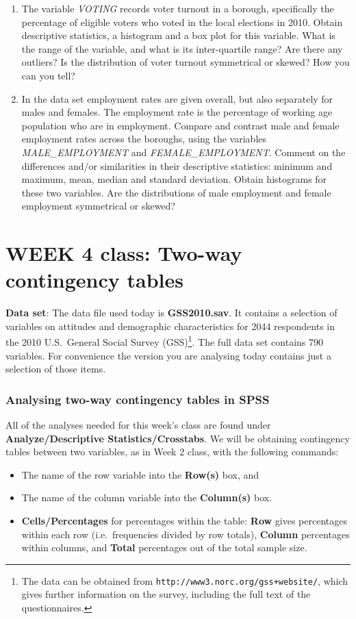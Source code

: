 
\begin{enumerate}
\item
The variable \emph{VOTING} records voter turnout in a borough, specifically
the percentage of eligible voters who voted in the local elections in 2010.
Obtain descriptive statistics, a histogram and a box plot for this variable. What is the
range of the variable, and what is its inter-quartile range? Are there any outliers?
Is the distribution of voter turnout symmetrical or skewed? How you can you tell?
\item
In the data set employment rates are given overall, but also separately
for males and females. The employment rate is the percentage of working age population
who are in employment. Compare and contrast male and female employment
rates across the boroughs, using the variables \emph{MALE\_EMPLOYMENT}
and \emph{FEMALE\_EMPLOYMENT}. Comment on the differences and/or similarities in
their descriptive statistics: minimum and maximum, mean, median and standard deviation. Obtain
histograms for these two variables. Are the distributions
of male employment and female employment symmetrical or skewed?
\end{enumerate}


\newpage
\section[Week 4: Two-way contingency tables]{WEEK 4 class: Two-way contingency tables}

\textbf{Data set}:
The data file used today is \textbf{GSS2010.sav}. It contains a
selection of variables on attitudes and demographic characteristics for
2044 respondents in the 2010 U.S.\ General Social Survey
(GSS)\footnote{The data can be obtained from
\texttt{http://www3.norc.org/gss+website/}, which gives further information on
the survey, including the full text of the questionnaires. }. The full data set
contains 790 variables. For convenience the version you are analysing today
contains just a selection of those items.

\subsubsection{Analysing two-way contingency tables in SPSS}

All of the analyses needed for this week's class are found
under \textbf{Analyze/Descriptive Statistics/Crosstabs}. We will be
obtaining contingency tables between two variables, as in Week 2 class,
with the following commands:
\begin{itemize}
\item
The name of the row
variable into the \textbf{Row(s)} box, and
\item
The name of the column
variable into the \textbf{Column(s)} box.
\item
\textbf{Cells/Percentages} for percentages within the table:
\textbf{Row} gives percentages within each row (i.e.\ frequencies
divided by row totals), \textbf{Column}
percentages within columns, and
\textbf{Total} percentages out of the total sample size.
\end{itemize}

